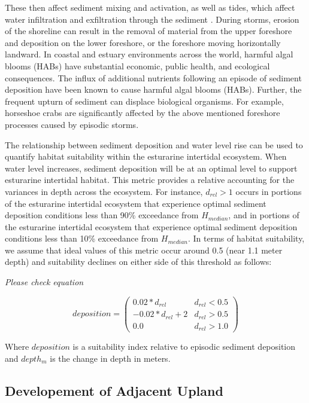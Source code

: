 \documentclass[
]{book}
\begin{document}
These then affect sediment mixing and activation, as well as tides, which affect water infiltration and exfiltration through the sediment \citep{nancy_jackson_armoring_2010}. During storms, erosion of the shoreline can result in the removal of material from the upper foreshore and deposition on the lower foreshore, or the foreshore moving horizontally landward. In coastal and estuary environments across the world, harmful algal blooms (HABs) have substantial economic, public health, and ecological consequences. The influx of additional nutrients following an episode of sediment deposition have been known to cause harmful algal blooms (HABs)\citep{ralston_temperature_2014}. Further, the frequent upturn of sediment can displace biological organisms. For example, horseshoe crabs are significantly affected by the above mentioned foreshore processes caused by episodic storms.

The relationship between sediment deposition and water level rise can be used to quantify habitat suitability within the esturarine intertidal ecosystem. When water level increases, sediment deposition will be at an optimal level to support esturarine intertidal habitat. This metric provides a relative accounting for the variances in depth across the ecosystem. For instance, \(d_{rel}>1\) occurs in portions of the esturarine intertidal ecosystem that experience optimal sediment deposition conditions less than 90\% exceedance from \(H_{median}\), and in portions of the esturarine intertidal ecosystem that experience optimal sediment deposition conditions less than 10\% exceedance from \(H_{median}\). In terms of habitat suitability, we assume that ideal values of this metric occur around 0.5 (near 1.1 meter depth) and suitability declines on either side of this threshold as follows:

\emph{Please check equation}

\[deposition = \begin{pmatrix} 0.02*d_{rel} & d_{rel}<0.5\\
-0.02*d_{rel}+2 & d_{rel}>0.5\\
0.0 & d_{rel}>1.0
\end{pmatrix}\]

Where \(deposition\) is a suitability index relative to episodic sediment deposition and \(depth_{m}\) is the change in depth in meters.

\hypertarget{developement-of-adjacent-upland}{%
\subsection{Developement of Adjacent Upland}\label{developement-of-adjacent-upland}}
\end{document}
